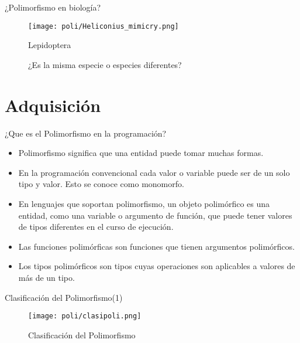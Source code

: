 \documentclass{beamer}
\begin{document}
\begin{frame}[fragile]{¿Polimorfismo en biología?} 
\begin{figure}
\centering
\begin{minipage}{.9\textwidth}
\centering
\texttt{[image: poli/Heliconius\_mimicry.png]}
\caption{Lepidoptera}
\end{minipage}
\caption{¿Es la misma especie o especies diferentes?}
\end{figure}

\end{frame}


\section{Adquisición}

\begin{frame}[fragile]{¿Que es el Polimorfismo en la programación?}

    \begin{itemize}
        \item Polimorfismo significa que una entidad puede tomar muchas formas.
        \item En la programación convencional cada valor o variable puede ser de un solo tipo y valor. Esto se conoce como monomorfo. 
        \item En lenguajes que soportan polimorfismo, un objeto polimórfico es una entidad, como una variable o argumento de función, que puede tener valores de tipos diferentes en el curso de ejecución. 
        \item Las funciones polimórficas son funciones que tienen argumentos polimórficos.
        \item Los tipos polimórficos son tipos cuyas operaciones son aplicables a valores de más de un tipo. 
    \end{itemize}


\end{frame} 



\begin{frame}[fragile]{Clasificación del Polimorfismo(1)}

\begin{figure}
\centering
\begin{minipage}{.9\textwidth}
\centering
\texttt{[image: poli/clasipoli.png]}
\caption{Clasificación del Polimorfismo}\cite{Cardelli1985}

\end{minipage}

\end{figure}

\end{frame}  
\end{document}
